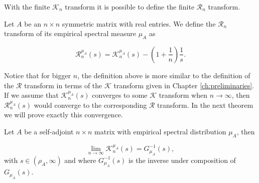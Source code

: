 With the finite $\mathcal K_n$ transform it is possible to define the finite $\mathcal R_n$ transform. 

\begin{definition}
    Let $A$ be an $n\times n$ symmetric matrix with real entries. We define the $\mathcal R_n$ transform of its empirical spectral measure $\mu_A$ as 

    \begin{equation*}
        \mathcal R_n^{\mu_A} (s) = \mathcal K_n^{\mu_A}(s) - \left( 1 + \frac1n \right) \frac1s.
    \end{equation*}
\end{definition}

Notice that for bigger $n$, the definition above is more similar to the definition of the $\mathcal R$ transform in terms of the $\mathcal K$ transform given in Chapter \ref{ch:preliminaries}. If we assume that $\mathcal K_n^{\mu_A}(s)$ converges to some $\mathcal K$ transform when $n\to\infty$, then $\mathcal R_n^{\mu_A}(s)$ would converge to the corresponding $\mathcal R$ transform. In the next theorem we will prove exactly this convergence.

\begin{theorem} Let $A$ be a self-adjoint $n \times n$ matrix with empirical spectral distribution $\mu_A$, then

    \begin{equation*}
        \lim_{n\to\infty} \mathcal K_n^{\mu_A} (s) = G_{\mu_A}^{-1}(s),
    \end{equation*}
\noindent with $s \in (\rho_A, \infty)$ and where $G_{\mu_A}^{-1}(s)$ is the inverse under composition of $G_{\mu_A}(s)$.
\end{theorem}

